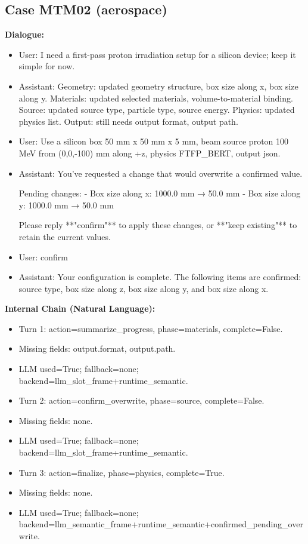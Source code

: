 \documentclass[11pt]{ctexart}
\begin{document}
\subsection{Case MTM02 (aerospace)}
\textbf{Dialogue:}
\begin{itemize}
\item User: I need a first-pass proton irradiation setup for a silicon device; keep it simple for now.
\item Assistant: Geometry: updated geometry structure, box size along x, box size along y. Materials: updated selected materials, volume-to-material binding. Source: updated source type, particle type, source energy. Physics: updated physics list. Output: still needs output format, output path.
\item User: Use a silicon box 50 mm x 50 mm x 5 mm, beam source proton 100 MeV from (0,0,-100) mm along +z, physics FTFP\_BERT, output json.
\item Assistant: You've requested a change that would overwrite a confirmed value.

Pending changes:
- Box size along x: 1000.0 mm → 50.0 mm
- Box size along y: 1000.0 mm → 50.0 mm

Please reply **"confirm"** to apply these changes, or **"keep existing"** to retain the current values.
\item User: confirm
\item Assistant: Your configuration is complete. The following items are confirmed: source type, box size along z, box size along y, and box size along x.
\end{itemize}
\textbf{Internal Chain (Natural Language):}
\begin{itemize}
\item Turn 1: action=summarize\_progress, phase=materials, complete=False.
\item Missing fields: output.format, output.path.
\item LLM used=True; fallback=none; backend=llm\_slot\_frame+runtime\_semantic.
\item Turn 2: action=confirm\_overwrite, phase=source, complete=False.
\item Missing fields: none.
\item LLM used=True; fallback=none; backend=llm\_slot\_frame+runtime\_semantic.
\item Turn 3: action=finalize, phase=physics, complete=True.
\item Missing fields: none.
\item LLM used=True; fallback=none; backend=llm\_semantic\_frame+runtime\_semantic+confirmed\_pending\_overwrite.
\end{itemize}
\end{document}
